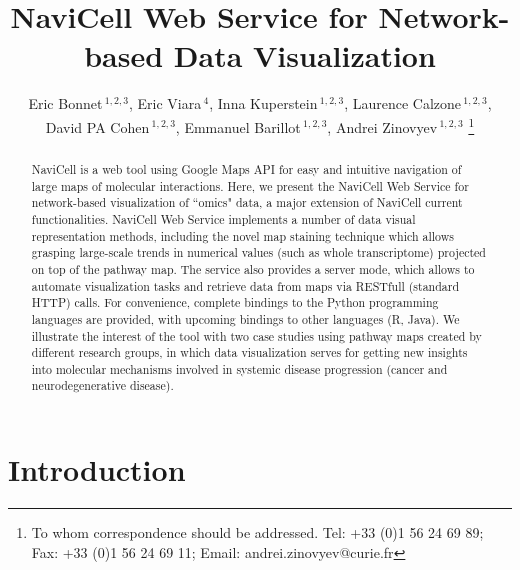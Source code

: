 \documentclass[a4,center,fleqn]{NAR}
\begin{document}
\title{NaviCell Web Service for Network-based Data Visualization}


\author{%
Eric Bonnet\,$^{1,2,3}$,
Eric Viara\,$^{4}$,
Inna Kuperstein\,$^{1,2,3}$,
Laurence Calzone\,$^{1,2,3}$,
David PA Cohen\,$^{1,2,3}$,
Emmanuel Barillot\,$^{1,2,3}$,
Andrei Zinovyev\,$^{1,2,3}$%
\footnote{To whom correspondence should be addressed.
Tel: +33 (0)1 56 24 69 89; Fax: +33 (0)1 56 24 69 11; Email: andrei.zinovyev@curie.fr}}

\address{%
$^{1}$Institut Curie, 26 rue d'Ulm, 75248 Paris, France,
$^{2}$INSERM U900, 75248 Paris, France,
$^{3}$Mines ParisTech, 77300 Fontainebleau, France,
$^{4}$Sysra, 91330 Yerres, France.
}




\maketitle

\begin{abstract}
NaviCell is a web tool using Google Maps API for easy and intuitive navigation
of large maps of molecular interactions. Here, we present the NaviCell Web
Service for network-based visualization of  ``omics" data, a major extension of
NaviCell current functionalities.  NaviCell Web Service implements a number of
data visual representation methods, including the novel map staining technique
which allows grasping large-scale trends in numerical values (such as whole
transcriptome) projected on top of the pathway map. The service also provides a
server mode, which allows to automate visualization tasks and retrieve data
from maps via RESTfull (standard HTTP) calls.  For convenience, complete
bindings to the Python programming languages are provided, with upcoming
bindings to other languages (R, Java).  We illustrate the interest of the tool
with  two case studies using pathway maps created by different research groups,
in which data visualization serves for getting new insights into molecular
mechanisms involved in systemic disease progression (cancer and
neurodegenerative disease).

\end{abstract}


\section{Introduction}
\end{document}
